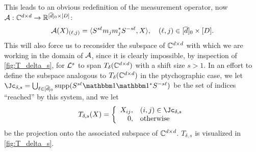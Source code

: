 This leads to an obvious redefinition of the measurement operator, now $\mathcal{A} : \mathbb{C}^{d \times d} \to \mathbb{R}^{[\overline{d}]_0 \times [D]}$: \begin{equation} \mathcal{A}(X)_{(\ell, j)} = \langle S^{s \ell} m_j m_j^* S^{-s \ell}, X\rangle, \quad (\ell, j) \in [\overline{d}]_0 \times [D]. \label{eq:pty_meas_op} \end{equation}  This will also force us to reconsider the subspace of $\mathbb{C}^{d \times d}$ with which we are working in the domain of $\mathcal{A}$, since it is clearly impossible, by inspection of \cref{fig:T_delta_s}, for $\mathcal{L}^s$ to span $T_\delta(\mathbb{C}^{d \times d})$ with a shift size $s > 1$.  In an effort to define the subspace analogous to $T_\delta(\mathbb{C}^{d \times d})$ in the ptychographic case, we let $\Jc_{\delta, s} = \bigcup_{\ell \in [\dbar]_0}\supp(S^{s \ell} \one \one^* S^{-s \ell})$ be the set of indices ``reached'' by this system, and we let \begin{equation} T_{\delta, s}(X) = \left\{\begin{array}{r@{,\quad}l} X_{ij} & (i, j) \in \Jc_{\delta, s} \\ 0 & \text{otherwise}\end{array}\right.\label{eq:T_delta_s}\end{equation} be the projection onto the associated subspace of $\mathbb{C}^{d \times d}$.  $T_{\delta, s}$ is visualized in \cref{fig:T_delta_s}.
